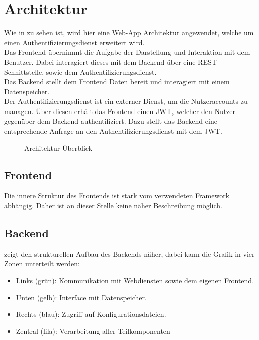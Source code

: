 \chapter{Architektur}\label{ch:architektur}
Wie in  zu sehen ist, wird hier eine Web-App Architektur angewendet,
welche um einen Authentifizierungsdienst erweitert wird.\\
Das Frontend übernimmt die Aufgabe der Darstellung und Interaktion mit dem Benutzer.
Dabei interagiert dieses mit dem Backend über eine \ac{REST} Schnittstelle, sowie dem Authentifizierungsdienst.\\
Das Backend stellt dem Frontend Daten bereit und interagiert mit einem Datenspeicher.\\
Der Authentifizierungsdienst ist ein externer Dienst, um die Nutzeraccounts zu managen.
Über diesen erhält das Frontend einen \ac{JWT}, welcher den Nutzer gegenüber dem Backend authentifiziert.
Dazu stellt das Backend eine entsprechende Anfrage an den Authentifizierungsdienst mit dem \ac{JWT}.

\begin{figure}[h]
    \centering
    
    \caption{Architektur Überblick}\label{fig:HighLevelArch}
\end{figure}

\section{Frontend}\label{sec:frontend}

Die innere Struktur des Frontends ist stark vom verwendeten Framework abhängig.
Daher ist an dieser Stelle keine näher Beschreibung möglich.

\section{Backend}\label{sec:fokus:-backend}

 zeigt den strukturellen Aufbau des Backends näher, dabei kann die Grafik in vier Zonen unterteilt werden:
\begin{itemize}
    \item Links (grün): Kommunikation mit Webdiensten sowie dem eigenen Frontend.
    \item Unten (gelb): Interface mit Datenspeicher.
    \item Rechts (blau): Zugriff auf Konfigurationsdateien.
    \item Zentral (lila): Verarbeitung aller Teilkomponenten
\end{itemize}

